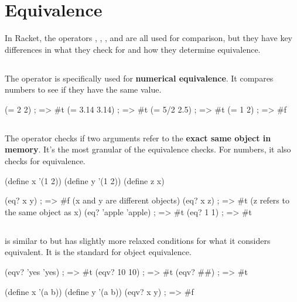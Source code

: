 
\section{Equivalence}

In Racket, the operators \code{=}, , , and  are all used for comparison, but they have key differences in what they check for and how they determine equivalence.

\subsection{\code{=}}
The \code{=} operator is specifically used for \textbf{numerical equivalence}. It compares numbers to see if they have the same value.

\begin{racketcode}
(= 2 2)          ; => #t
(= 3.14 3.14)    ; => #t
(= 5/2 2.5)      ; => #t
(= 1 2)          ; => #f
\end{racketcode}

\subsection{}
The  operator checks if two arguments refer to the \textbf{exact same object in memory}. It's the most granular of the equivalence checks. For numbers, it also checks for equivalence.

\begin{racketcode}
(define x '(1 2))
(define y '(1 2))
(define z x)

(eq? x y) ; => #f (x and y are different objects)
(eq? x z) ; => #t (z refers to the same object as x)
(eq? 'apple 'apple) ; => #t
(eq? 1 1) ; => #t
\end{racketcode}

\subsection{}
 is similar to  but has slightly more relaxed conditions for what it considers equivalent. It is the standard for object equivalence.

\begin{racketcode}
(eqv? 'yes 'yes) ; => #t
(eqv? 10 10) ; => #t
(eqv? #\A #\A) ; => #t

(define x '(a b))
(define y '(a b))
(eqv? x y) ; => #f
\end{racketcode}

